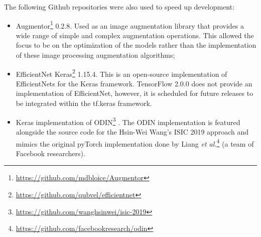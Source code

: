     The following Github repositories were also used to speed up development: 
    \begin{itemize}
        \item Augmentor\footnote{\url{https://github.com/mdbloice/Augmentor}} 0.2.8. Used as an image augmentation library that provides a wide range of simple and complex augmentation operations. This allowed the focus to be on the optimization of the models rather than the implementation of these image processing augmentation algorithms;
        \item EfficientNet Keras\footnote{\url{https://github.com/qubvel/efficientnet}} 1.15.4. This is an open-source implementation of EfficientNets for the Keras framework. TensorFlow 2.0.0 does not provide an implementation of EfficientNet, however, it is scheduled for future releases to be integrated within the tf.keras framework.
        \item Keras implementation of \ac{ODIN}\footnote{\url{https://github.com/wanghsinwei/isic-2019}} \cite{odin}. The \ac{ODIN} implementation is featured alongside the source code for the Hsin-Wei Wang's \ac{ISIC} 2019 approach and mimics the original pyTorch implementation done by Liang \textit{et al.}\footnote{\url{https://github.com/facebookresearch/odin}} (a team of Facebook researchers).
    \end{itemize}